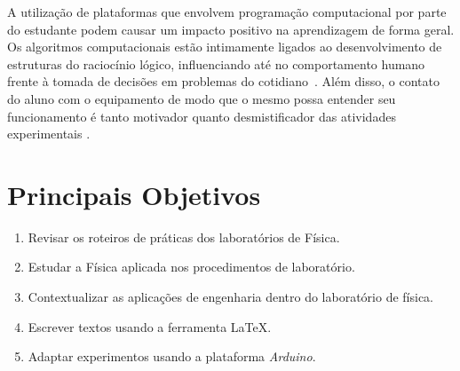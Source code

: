 \documentclass[portrait,a0]{a0poster}
\begin{document}
\begin{multicols}{2}


A utilização de plataformas que envolvem programação computacional por parte do estudante podem causar um impacto positivo na aprendizagem de forma geral.
Os algoritmos computacionais estão intimamente ligados ao desenvolvimento de estruturas do raciocínio lógico, influenciando até no comportamento humano frente à tomada de decisões em problemas do cotidiano~\cite{Zanetti_2015}.
Além disso, o contato do aluno com o equipamento de modo que o mesmo possa entender seu funcionamento é tanto motivador quanto desmistificador das atividades experimentais \cite{Rosa2003}.



\color{DarkSlateGray} %

\section*{Principais Objetivos}

\begin{enumerate}
\item Revisar os roteiros de práticas dos laboratórios de Física.
\item Estudar a Física aplicada nos procedimentos de laboratório.
\item Contextualizar as aplicações de engenharia dentro do laboratório de física.
\item Escrever textos usando a ferramenta \LaTeX.
\item Adaptar experimentos usando a plataforma \emph{Arduino}.
\end{enumerate}



\end{multicols}
\end{document}
